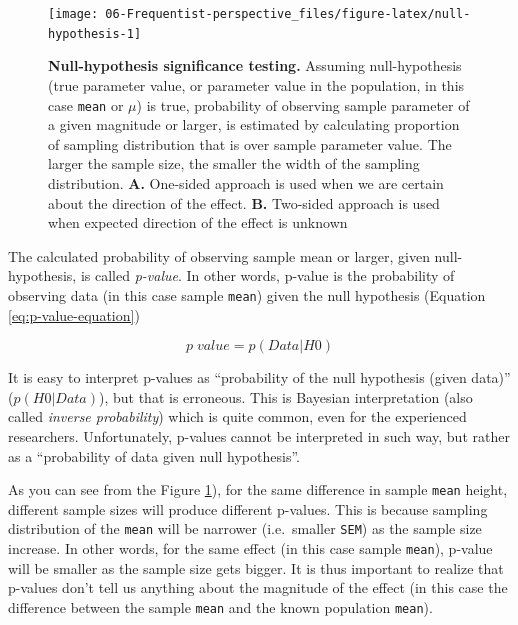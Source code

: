 \documentclass[
]{book}
\begin{document}
\begin{figure}

{\centering \texttt{[image: 06-Frequentist-perspective\_files/figure-latex/null-hypothesis-1]} 

}

\caption{\textbf{Null-hypothesis significance testing. }Assuming null-hypothesis (true parameter value, or parameter value in the population, in this case \texttt{mean} or \(\mu\)) is true, probability of observing sample parameter of a given magnitude or larger, is estimated by calculating proportion of sampling distribution that is over sample parameter value. The larger the sample size, the smaller the width of the sampling distribution. \textbf{A.} One-sided approach is used when we are certain about the direction of the effect. \textbf{B.} Two-sided approach is used when expected direction of the effect is unknown}\label{fig:null-hypothesis}
\end{figure}



The calculated probability of observing sample mean or larger, given null-hypothesis, is called \emph{p-value}. In other words, p-value is the probability of observing data (in this case sample \texttt{mean}) given the null hypothesis (Equation \eqref{eq:p-value-equation})

\begin{equation}
  p \; value = p(Data | H{0}) 
  \label{eq:p-value-equation}
\end{equation}

It is easy to interpret p-values as ``probability of the null hypothesis (given data)'' (\(p(H{0}|Data)\)), but that is erroneous. This is Bayesian interpretation (also called \emph{inverse probability}) which is quite common, even for the experienced researchers. Unfortunately, p-values cannot be interpreted in such way, but rather as a ``probability of data given null hypothesis''.

As you can see from the Figure \ref{fig:null-hypothesis}), for the same difference in sample \texttt{mean} height, different sample sizes will produce different p-values. This is because sampling distribution of the \texttt{mean} will be narrower (i.e.~smaller \texttt{SEM}) as the sample size increase. In other words, for the same effect (in this case sample \texttt{mean}), p-value will be smaller as the sample size gets bigger. It is thus important to realize that p-values don't tell us anything about the magnitude of the effect (in this case the difference between the sample \texttt{mean} and the known population \texttt{mean}).
\end{document}
